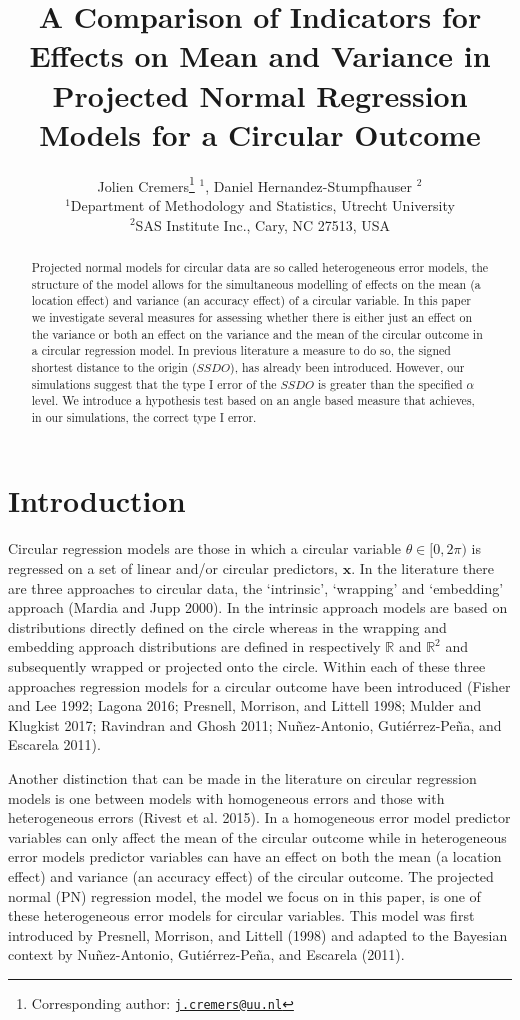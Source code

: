 \documentclass[11pt,]{article}
\title{A Comparison of Indicators for Effects on Mean and Variance in Projected
Normal Regression Models for a Circular Outcome}
\author{Jolien Cremers\footnote{Corresponding author:
  \href{mailto:j.cremers@uu.nl}{\nolinkurl{j.cremers@uu.nl}}} \(^1\),
Daniel Hernandez-Stumpfhauser \(^{2}\)\\
\(^1\)Department of Methodology and Statistics, Utrecht University\\
\(^2\)SAS Institute Inc., Cary, NC 27513, USA}
\date{}
\begin{document}
\maketitle
\begin{abstract}
Projected normal models for circular data are so called heterogeneous
error models, the structure of the model allows for the simultaneous
modelling of effects on the mean (a location effect) and variance (an
accuracy effect) of a circular variable. In this paper we investigate
several measures for assessing whether there is either just an effect on
the variance or both an effect on the variance and the mean of the
circular outcome in a circular regression model. In previous literature
a measure to do so, the signed shortest distance to the origin
(\(SSDO\)), has already been introduced. However, our simulations
suggest that the type I error of the \(SSDO\) is greater than the
specified \(\alpha\) level. We introduce a hypothesis test based on an
angle based measure that achieves, in our simulations, the correct type
I error.
\end{abstract}

\section{Introduction}

Circular regression models are those in which a circular variable
\(\theta \in [0, 2\pi)\) is regressed on a set of linear and/or circular
predictors, \(\boldsymbol{x}\). In the literature there are three
approaches to circular data, the `intrinsic', `wrapping' and `embedding'
approach (Mardia and Jupp 2000). In the intrinsic approach models are
based on distributions directly defined on the circle whereas in the
wrapping and embedding approach distributions are defined in
respectively \(\mathbb{R}\) and \(\mathbb{R}^2\) and subsequently
wrapped or projected onto the circle. Within each of these three
approaches regression models for a circular outcome have been introduced
(Fisher and Lee 1992; Lagona 2016; Presnell, Morrison, and Littell 1998;
Mulder and Klugkist 2017; Ravindran and Ghosh 2011; Nuñez-Antonio,
Gutiérrez-Peña, and Escarela 2011).

Another distinction that can be made in the literature on circular
regression models is one between models with homogeneous errors and
those with heterogeneous errors (Rivest et al. 2015). In a homogeneous
error model predictor variables can only affect the mean of the circular
outcome while in heterogeneous error models predictor variables can have
an effect on both the mean (a location effect) and variance (an accuracy
effect) of the circular outcome. The projected normal (PN) regression
model, the model we focus on in this paper, is one of these
heterogeneous error models for circular variables. This model was first
introduced by Presnell, Morrison, and Littell (1998) and adapted to the
Bayesian context by Nuñez-Antonio, Gutiérrez-Peña, and Escarela (2011).
\end{document}
